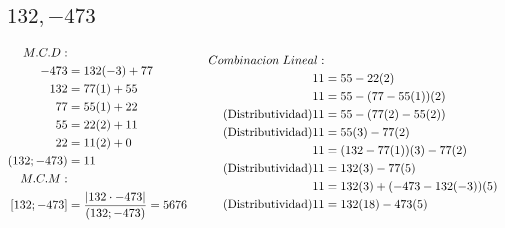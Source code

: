 \documentclass[12pt]{article}
\begin{document}
        \subsection{$132,-473$}
            \begin{equation*}
                \begin{aligned}[c]
                    M.C.D: \\
                    -473 &= 132 (-3) + 77 \\
                    132 &= 77(1) + 55 \\
                    77 &= 55(1) + 22 \\
                    55 &= 22(2) + 11 \\
                    22 &= 11(2) + 0 \\
                    (132;-473) &= 11 \\
                    M.C.M: \\
                    \notag [132;-473] &= \frac{|132 \cdot -473|}{(132;-473)} = 5676
                \end{aligned}
                \begin{aligned}[c]
                Combinacion \; Lineal: \\
                    \notag 11 &= 55-22(2) \\
                    \notag 11 &= 55-(77-55(1))(2) \\
                    \tag{Distributividad} 11 &= 55-(77(2)-55(2)) \\
                    \tag{Distributividad} 11 &= 55(3)-77(2) \\
                    \notag 11 &= (132-77(1))(3)-77(2) \\
                    \tag{Distributividad} 11 &=  132(3)-77(5)\\
                    \notag 11 &=  132(3) + (-473-132(-3))(5)\\
                    \tag{Distributividad} 11 &=  132(18)-473(5)\\
                \end{aligned}
            \end{equation*}
\end{document}
